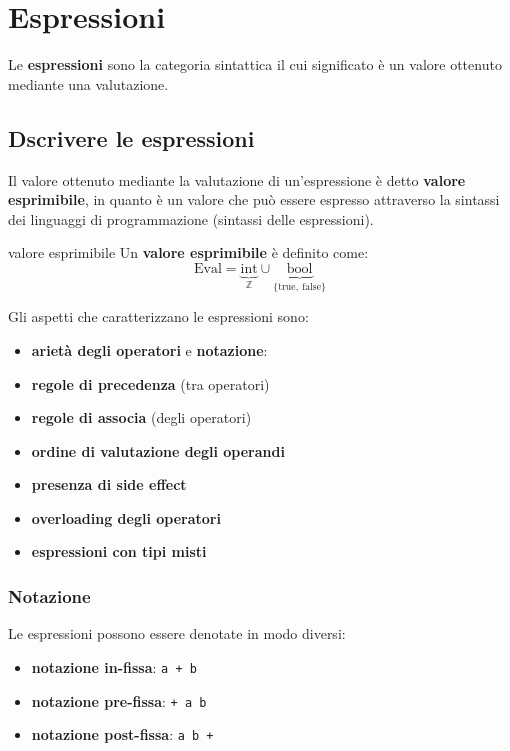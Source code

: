 
\chapter{Espressioni}
Le \textcolor{colore}{\textbf{espressioni}} sono la categoria sintattica il cui significato è un valore ottenuto mediante una valutazione.

\section{Dscrivere le espressioni}
Il valore ottenuto mediante la valutazione di un'espressione è detto \textcolor{colore}{\textbf{valore esprimibile}}, in quanto è un valore che può essere espresso attraverso la sintassi dei linguaggi di programmazione (sintassi delle espressioni).

\begin{mydef}{valore esprimibile}
    Un \textbf{valore esprimibile} è definito come:
    \begin{equation*}
        \mathrm{Eval} = \underbrace{\mathrm{int}}_{\mathbb{Z}} \cup \underbrace{\mathrm{bool}}_{\mathrm{\{true, \ false\}}}
    \end{equation*}
\end{mydef}

Gli aspetti che caratterizzano le espressioni sono:
\begin{itemize}[label=$\triangleright$, itemsep=\smallskipamount]
    \item \textbf{arietà degli operatori} e \textbf{notazione}:
    \item \textbf{regole di precedenza} (tra operatori)
    \item \textbf{regole di associa} (degli operatori)
    \item \textbf{ordine di valutazione degli operandi}
    \item \textbf{presenza di side effect}
    \item \textbf{overloading degli operatori}
    \item \textbf{espressioni con tipi misti}
\end{itemize}

\subsection{Notazione}
Le espressioni possono essere denotate in modo diversi:
\begin{itemize}[label=$\circ$, itemsep=\smallskipamount]
    \item \textbf{notazione in-fissa}: \texttt{a + b}
    \item \textbf{notazione pre-fissa}: \texttt{+ a b}
    \item \textbf{notazione post-fissa}: \texttt{a b +}
\end{itemize}

